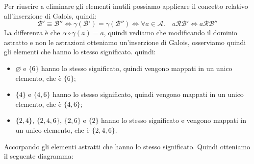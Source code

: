 Per riuscire a eliminare gli elementi inutili possiamo applicare
il concetto relativo all'inserzione di Galois, quindi:
\[
  \mathcal{B}' \equiv \mathcal{B}''
  \iff \gamma(\mathcal{B}') = \gamma(\mathcal{B}'') 
  \iff \forall a \in
  \mathcal{A} . \quad a \mathcal{RB}' \iff a \mathcal{RB}'' 
\]
La differenza è che $ \alpha \circ \gamma(a) = a $, quindi
vediamo che modificando il dominio astratto e non le astrazioni 
otteniamo un'inserzione di Galois, osserviamo quindi gli elementi che 
hanno lo stesso significato.
quindi:
\begin{itemize}
    \item $\varnothing$ e $\{6\}$ hanno lo stesso significato, quindi
    vengono mappati in un unico elemento, che è $\{6\}$;
    \item $\{4\}$ e $\{4,6\}$ hanno lo stesso significato, quindi
    vengono mappati in un unico elemento, che è $\{4,6\}$;
    \item $\{2,4\}$, $\{2,4,6\}$, $\{2,6\}$ e $\{2\}$ hanno lo stesso
    significato e vengono mappati in un unico elemento, che è $\{2,4,6\}$.
\end{itemize} 
Accorpando gli elementi astratti che hanno lo stesso significato.
Quindi otteniamo il seguente diagramma:
